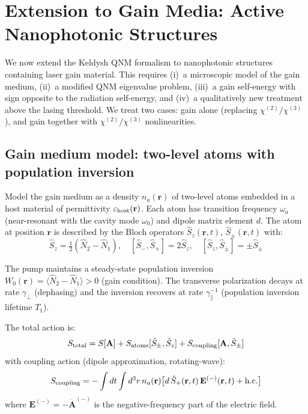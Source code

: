 \documentclass[12pt]{article}
\begin{document}
\section{Extension to Gain Media: Active Nanophotonic Structures}
\label{sec:gain}

We now extend the Keldysh QNM formalism to nanophotonic structures
containing laser gain material.  This requires (i)~a microscopic model
of the gain medium, (ii)~a modified QNM eigenvalue problem, (iii)~a
gain self-energy with sign opposite to the radiation self-energy, and
(iv)~a qualitatively new treatment above the lasing threshold.
We treat two cases: gain alone (replacing $\chi^{(2)}/\chi^{(3)}$), and
gain together with $\chi^{(2)}/\chi^{(3)}$ nonlinearities.

\subsection{Gain medium model: two-level atoms with population inversion}
\label{sec:gain_model}

Model the gain medium as a density $n_a(\mathbf{r})$ of two-level atoms
embedded in a host material of permittivity $\varepsilon_{\rm host}(\mathbf{r})$.
Each atom has transition frequency $\omega_a$ (near-resonant with the
cavity mode $\omega_0$) and dipole matrix element $d$.  The atom at
position $\mathbf{r}$ is described by the Bloch operators
$\hat{S}_z(\mathbf{r},t)$, $\hat{S}_\pm(\mathbf{r},t)$ with:
\begin{equation}
  \hat{S}_z = \tfrac{1}{2}(\hat{N}_2 - \hat{N}_1),\quad
  [\hat{S}_-,\hat{S}_+] = 2\hat{S}_z,\quad
  [\hat{S}_z,\hat{S}_\pm] = \pm\hat{S}_\pm
  \label{eq:bloch_algebra}
\end{equation}

The pump maintains a steady-state population inversion
$W_0(\mathbf{r}) = \langle\hat{N}_2 - \hat{N}_1\rangle > 0$
(gain condition).  The transverse polarization decays at rate $\gamma_\perp$
(dephasing) and the inversion recovers at rate $\gamma_\parallel^{-1}$
(population inversion lifetime $T_1$).

The total action is:
\begin{equation}
  S_{\rm total} = S[\mathbf{A}]
  + S_{\rm atoms}[\hat{S}_\pm,\hat{S}_z]
  + S_{\rm coupling}[\mathbf{A},\hat{S}_\pm]
  \label{eq:total_action_gain}
\end{equation}
with coupling action (dipole approximation, rotating-wave):
\begin{equation}
  S_{\rm coupling} = -\int dt\int d^3r\, n_a(\mathbf{r})
  \bigl[d\,\hat{S}_+(\mathbf{r},t)\,\mathbf{E}^{(-)}(\mathbf{r},t)
  + \mathrm{h.c.}\bigr]
  \label{eq:coupling_action_gain}
\end{equation}
where $\mathbf{E}^{(-)} = -\dot{\mathbf{A}}^{(-)}$ is the negative-frequency
part of the electric field.
\end{document}

